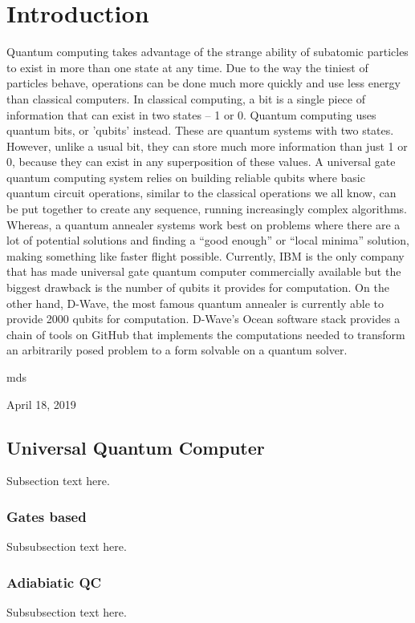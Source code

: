 \documentclass[12pt,conference]{IEEEtran}
\begin{document}
\section{Introduction}
Quantum computing takes advantage of the strange ability of subatomic particles to exist in more than one state at any time. Due to the way the tiniest of particles behave, operations can be done much more quickly and use less energy than classical computers.
In classical computing, a bit is a single piece of information that can exist in two states – 1 or 0. Quantum computing uses quantum bits, or 'qubits' instead. These are quantum systems with two states. However, unlike a usual bit, they can store much more information than just 1 or 0, because they can exist in any superposition of these values.
A universal gate quantum computing system relies on building reliable qubits where basic quantum circuit operations, similar to the classical operations we all know, can be put together to create any sequence, running increasingly complex algorithms. Whereas, a quantum annealer systems work best on problems where there are a lot of potential solutions and finding a “good enough” or “local minima” solution, making something like faster flight possible.
Currently, IBM is the only company that has made universal gate quantum computer commercially available but the biggest drawback is the number of qubits it provides for computation. On the other hand, D-Wave, the most famous quantum annealer is currently able to provide 2000 qubits for computation.
D-Wave’s Ocean software stack provides a chain of tools on GitHub that implements the computations needed to transform an arbitrarily posed problem to a form solvable on a quantum solver. 


\hfill mds
 
\hfill April 18, 2019

\subsection{Universal Quantum Computer}
Subsection text here.


\subsubsection{Gates based}
Subsubsection text here.

\subsubsection{Adiabiatic QC}
Subsubsection text here.
\end{document}
